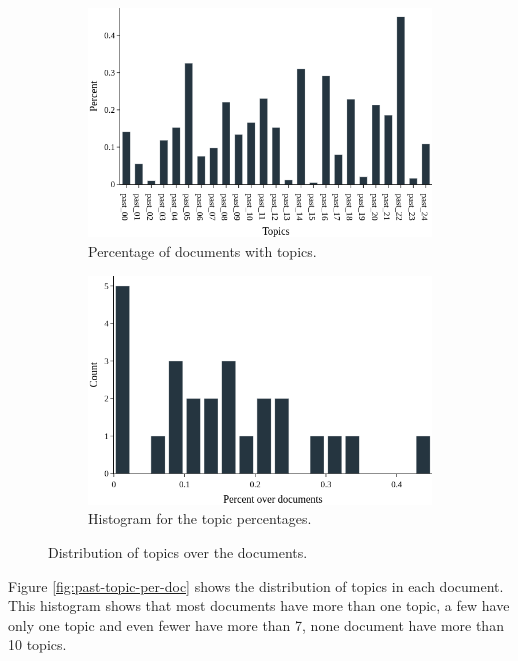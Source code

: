 \begin{figure}[h!]
	\begin{subfigure}{0.49\textwidth}
		\includegraphics[width=\linewidth]{01.Chapters/05.Results/past-percentage-bar}
		\caption{Percentage of documents with topics.}
		\label{fig:past-percentage-bar}
	\end{subfigure}%
	\hfill
	\begin{subfigure}{0.49\textwidth}
		\includegraphics[width=\linewidth]{01.Chapters/05.Results/past-percentage-hist}
		\caption{Histogram for the topic percentages.}
		\label{fig:past-percentage-hist}
	\end{subfigure}%
	\caption{Distribution of topics over the documents.}
	\label{fig:past-topic-dist}
\end{figure}

Figure \ref{fig:past-topic-per-doc} shows the distribution of topics in each document. This histogram shows that most documents have more than one topic, a few have only one topic and even fewer have more than 7, none document have more than 10 topics.

